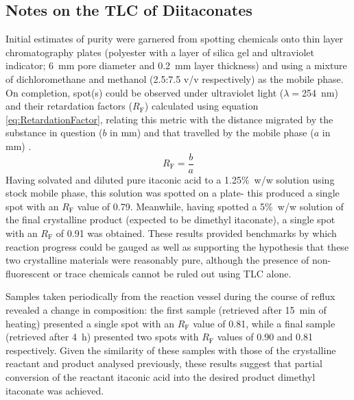 \subsection{Notes on the TLC of Diitaconates}
\label{subsec:NoOnThTLCOfDii}
Initial estimates of purity were garnered from spotting chemicals onto
 thin layer chromatography plates (polyester with a layer of silica gel and
 ultraviolet indicator; 6~\unit{\milli\metre} pore diameter and
 0.2~\unit{\milli\metre} layer thickness) and using a mixture of
 dichloromethane and methanol (2.5:7.5 v/v respectively) as the mobile phase.
On completion, spot(s) could be observed under ultraviolet light
 (\(\lambda=\)254~\unit{\nano\metre}) and their retardation factors
 (\(R_{\mathrm{F}}\)) calculated using equation \ref{eq:RetardationFactor},
 relating this metric with the distance migrated by the substance in
 question (\(b\) in \unit{\milli\metre}) and that travelled by the
 mobile phase (\(a\) in \unit{\milli\metre}) \autocite{Ettre1993}.
\begin{equation}\label{eq:RetardationFactor}
    R_{\mathrm{F}}=\frac{b}{a}
\end{equation}
Having solvated and diluted pure itaconic acid to a 1.25\unit{\percent}~w/w
 solution using stock mobile phase, this solution was spotted on a plate- this
 produced a single spot with an \(R_{\mathrm{F}}\) value of 0.79.
Meanwhile, having spotted a 5\unit{\percent}~w/w solution of the final
 crystalline product (expected to be dimethyl itaconate), a single spot with
 an \(R_{\mathrm{F}}\) of 0.91 was obtained.
These results provided benchmarks by which reaction progress could be
 gauged as well as supporting the hypothesis that these two crystalline
 materials were reasonably pure, although the
 presence of non-fluorescent or trace chemicals cannot be ruled out
 using TLC alone.

Samples taken periodically from the reaction vessel during the course of
 reflux revealed a change in composition: the first sample
 (retrieved after 15~\unit{\minute} of heating) presented a single spot with
 an \(R_{\mathrm{F}}\) value of 0.81, while a final sample (retrieved after 
 4~\unit{\hour}) presented two spots with \(R_{\mathrm{F}}\) values of 0.90 and 0.81
 respectively.
Given the similarity of these samples with those of the crystalline
 reactant and product analysed previously, these results suggest that
 partial conversion of the reactant itaconic acid into the desired product
 dimethyl itaconate was achieved.

